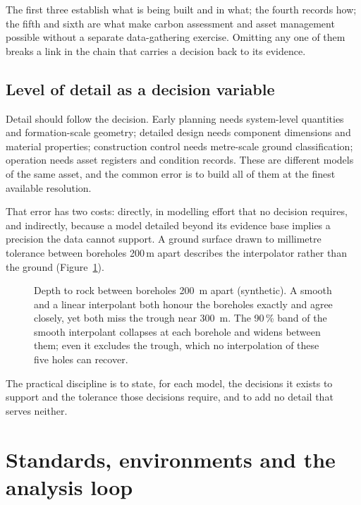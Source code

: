 The first three establish what is being built and in what; the fourth records
how; the fifth and sixth are what make carbon assessment and asset management
possible without a separate data-gathering exercise. Omitting any one of them
breaks a link in the chain that
carries a decision back to its evidence.

\subsection{Level of detail as a decision variable}
\label{sec:level-of-detail}

Detail should follow the decision. Early planning needs system-level
quantities and formation-scale geometry; detailed design needs component
dimensions and material properties; construction control needs metre-scale
ground classification; operation needs asset registers and condition records.
These are different models of the same asset, and the common error is to build
all of them at the finest available resolution.

That error has two costs: directly, in modelling effort
that no decision requires, and indirectly, because a model detailed beyond its
evidence base implies a precision the data cannot support. A ground surface
drawn to millimetre tolerance between boreholes 200\,m apart describes
the interpolator rather than the ground (Figure~\ref{fig:dt-interpolation}).

\begin{figure}[htbp]
\centering
{}
\caption{Depth to rock between boreholes 200~m apart (synthetic). A smooth and
a linear interpolant both honour the boreholes exactly and agree closely, yet
both miss the trough near 300~m. The 90\,\% band of the smooth interpolant
collapses at each borehole and widens between them; even it excludes the
trough, which no interpolation of these five holes can recover.}
\label{fig:dt-interpolation}
\end{figure}

The practical discipline is to state, for each model, the decisions it exists
to support and the tolerance those decisions require, and to add no detail
that serves neither.

\section{Standards, environments and the analysis loop}
\label{sec:standards-and-loop}

